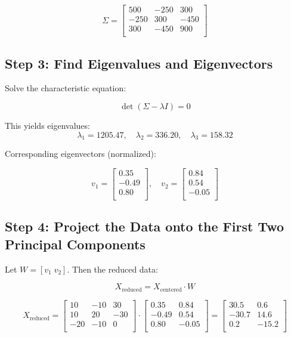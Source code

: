 \documentclass[a4paper,12pt]{article}
\begin{document}
\[
\Sigma = 
\begin{bmatrix}
500 & -250 & 300 \\
-250 & 300 & -450 \\
300 & -450 & 900 \\
\end{bmatrix}
\]

\subsection*{Step 3: Find Eigenvalues and Eigenvectors}

Solve the characteristic equation:

\[
\det(\Sigma - \lambda I) = 0
\]

This yields eigenvalues:
\[
\lambda_1 = 1205.47,\quad \lambda_2 = 336.20,\quad \lambda_3 = 158.32
\]

Corresponding eigenvectors (normalized):

\[
v_1 =
\begin{bmatrix}
0.35 \\
-0.49 \\
0.80 \\
\end{bmatrix},
\quad
v_2 =
\begin{bmatrix}
0.84 \\
0.54 \\
-0.05 \\
\end{bmatrix}
\]

\subsection*{Step 4: Project the Data onto the First Two Principal Components}

Let \( W = [v_1 \; v_2] \). Then the reduced data:

\[
X_{\text{reduced}} = X_{\text{centered}} \cdot W
\]

\[
X_{\text{reduced}} =
\begin{bmatrix}
10 & -10 & 30 \\
10 & 20 & -30 \\
-20 & -10 & 0 \\
\end{bmatrix}
\cdot
\begin{bmatrix}
0.35 & 0.84 \\
-0.49 & 0.54 \\
0.80 & -0.05 \\
\end{bmatrix}
=
\begin{bmatrix}
30.5 & 0.6 \\
-30.7 & 14.6 \\
0.2 & -15.2 \\
\end{bmatrix}
\]
\end{document}
